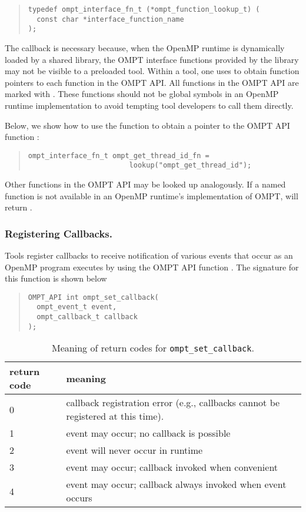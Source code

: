 \begin{quote}
\begin{verbatim}
typedef ompt_interface_fn_t (*ompt_function_lookup_t) (
  const char *interface_function_name
);
\end{verbatim}
\end{quote}

\noindent
The  callback is necessary because, when the OpenMP runtime is dynamically loaded by a shared library, the OMPT interface functions provided by the library may not be visible to a preloaded tool.
Within a tool, one uses  to obtain function pointers to each function in the OMPT API.
All functions in the OMPT API are marked with .
These functions should not be global symbols in an OpenMP runtime implementation to avoid tempting tool developers to call them directly. 

Below, we show how to use the  function to obtain a pointer to the OMPT API function :

\begin{quote}
\begin{verbatim}
ompt_interface_fn_t ompt_get_thread_id_fn =
                        lookup("ompt_get_thread_id");
\end{verbatim}
\end{quote}
Other functions in the OMPT API may be looked up analogously.
If a named function is not available in an OpenMP runtime's implementation of OMPT,  will return .

\subsubsection{Registering Callbacks.} 
Tools register callbacks to receive notification of various events that occur as an OpenMP program executes by using the OMPT API function .
The signature for this function is shown below
{
\begin{quote}
\begin{verbatim}
OMPT_API int ompt_set_callback(
  ompt_event_t event, 
  ompt_callback_t callback
);
\end{verbatim}
\end{quote}
}

\begin{table}
\centering
\begin{tabular}{|l|l|}
\hline
return code & meaning \\\hline
0 & callback registration error (e.g., callbacks cannot be registered at this time).\\\hline
1 & event may occur; no callback is possible\\\hline
2 & event will never occur in runtime\\\hline
3 & event may occur; callback invoked when convenient\\\hline
4 & event may occur; callback always invoked when event occurs\\\hline
\end{tabular}
\caption{Meaning of return codes for {\tt ompt\_set\_callback}.}
\label{table:ToolsSupport_set_rc}
\end{table}

